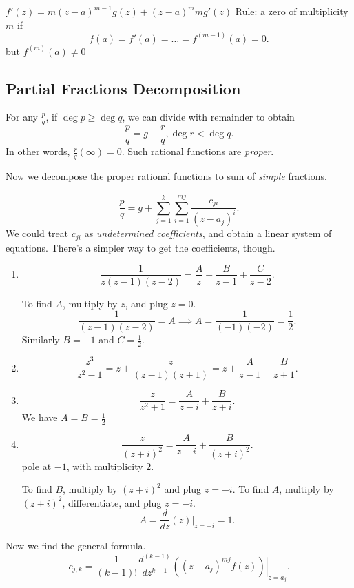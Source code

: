 
$f'(z) = m(z-a)^{m-1 }g(z) + (z-a)^mm g'(z)$ 
Rule: a zero of multiplicity $m$ if \[
	f(a) = f'(a) = \ldots = f^{(m-1)}(a) = 0
.\] 
but $f^{(m)}(a) \neq  0$

\subsection{Partial Fractions Decomposition}

For any $\frac{p}{q}$, if $\operatorname{deg} p \ge \operatorname{deg} q$, we can divide with remainder to obtain \[
	\frac{p}{q} = g + \frac{r}{q}, \operatorname{deg} r < \operatorname{deg} q
.\] 
In other words, $\frac{r}{q}(\infty ) = 0$. Such rational functions are \textit{proper}.

Now we decompose the proper rational functions to sum of \textit{simple} fractions.

\[
	\frac{p}{q} = g + \sum_{j=1}^{k} \sum_{i =1}^{mj } \frac{c_{j i}}{\left( z - a_j \right) ^i}
.\] 
We could treat  $c_{ji }$ as \textit{undetermined coefficients}, and obtain a linear system of equations. There's a simpler way to get the coefficients, though.

\begin{example}
	\begin{enumerate}
		\item 
	\[
		\frac{1}{z\left( z-1 \right) (z-2)} = \frac{A}{z}+\frac{B}{z-1}+\frac{C}{z-2}
	.\] 

	To find $A$, multiply by $z$, and plug $z = 0$.
	\[
		\frac{1}{(z-1)(z-2)} = A \implies A = \frac{1}{(-1)(-2) }= \frac{1}{2}
	.\] 
	Similarly $B = -1$ and $C = \frac{1}{2}$.
\item \[
	\frac{z^3}{z^2 - 1} = z + \frac{z}{(z-1)(z+1)} = z + \frac{A}{z-1}+\frac{B}{z+1}
.\] 
\item \[
	\frac{z}{z^2 + 1} = \frac{A}{z-i} + \frac{B}{z+i}
.\] 
We have $A = B = \frac{1}{2}$
\item \[
	\frac{z}{(z+i)^2} = \frac{A}{z+i} + \frac{B}{(z+i)^2}
.\] 
pole at $-1$, with multiplicity $2$.

To find $B$, multiply by $(z+i)^2$ and plug  $z=-i$. To find $A$, multiply by $(z+i)^2$, differentiate, and plug $z = -i$.
\[
	A = \frac{d}{dz}(z) |_{z = -i} = 1
.\] 
	\end{enumerate}
\end{example}

Now we find the general formula.
\[
	c_{j,k} = \frac{1}{(k-1)!}\frac{d^{(k-1)}}{dz^{k-1}} \left. \left( (z-a_j)^{mj }f(z) \right) \right|_{z = a_j}
.\] 

